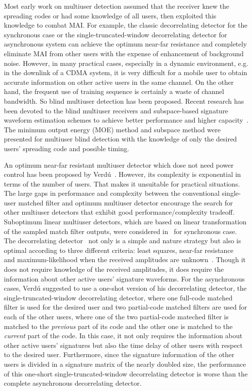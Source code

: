 \documentclass[a4paper,11pt,fleqn]{article}
\begin{document}
Most early work on multiuser detection assumed that the receiver
knew the spreading codes or had some knowledge of all users, then
exploited this knowledge to combat MAI. For example, the classic
decorrelating detector for the synchronous case or the
single-truncated-window decorrelating detector for asynchronous
system can achieve the optimum near-far resistance and completely
eliminate MAI from other users with the expense of enhancement of
background noise. However, in many practical cases, especially in
a dynamic environment, e.g. in the downlink of a CDMA system, it
is very difficult for a mobile user to obtain accurate information
on other active users in the same channel. On the other hand, the
frequent use of training sequence is certainly a waste of channel
bandwidth. So blind multiuser detection has been proposed. Recent
research has been devoted to the blind multiuser receivers and
subspace-based signature waveform estimation schemes to achieve
better performance and higher capacity~\cite{Honi95, Poor97,
Wang98, Torl97, Liu96}. The minimum output energy (MOE) method and
subspace method were presented for multiuser blind detection with
the knowledge of only the desired users' spreading code and
possible timing.

An optimum near-far resistant multiuser detector which dose not
need power control has been proposed by Verd\'{u}~\cite{Verd89}.
However, its complexity is exponential in terms of the number of
users. That makes it unsuitable for practical situations. The
large gaps in performance and complexity between the conventional
single-user matched filter and optimum multiuser detector
encourage the search for other multiuser detectors that exhibit
good performance/complexity tradeoff. Suboptimum linear multiuser
detectors, which are based on linear transformation of the sampled
match filter outputs, were considered in~\cite{Lupa89} for
synchronous case. The decorrelating detector~\cite{Lupa89} not
only is a simple and nature strategy but also is optimal according
to three different criteria: least squares, near-far
resistance~\cite{Verd86} and maximum-likelihood when the received
amplitudes are unknown~\cite{Lupa89}. Though it does not require
knowledge of the received amplitudes, it does require the
information about other active users' signature waveforms. For the
asynchronous cases, Verd\'{u} suggested to use a one-shot version
of his decorrelating detector, the single-truncated-window
decorrelating detector, where one full-code matched filter is used
for the desired user and two partial-code matched filters are used
for each of the other users, where one of the two partial-code
mateched filter is matched to the {\em previous} part of its code
and the other one is matched to the {\em current} part of the
code. In this case, it not only requires the information about
other active users' signatures but also the time delay of other
users with respect to the desired user. Furthermore, since the
signature information of the other users is divided in a signature
matrix of the nearly doubled size, the performance of this
one-short single-truncated-window decorrelating detector is worse
than the complete asynchronous decorrelating detector.
\end{document}
